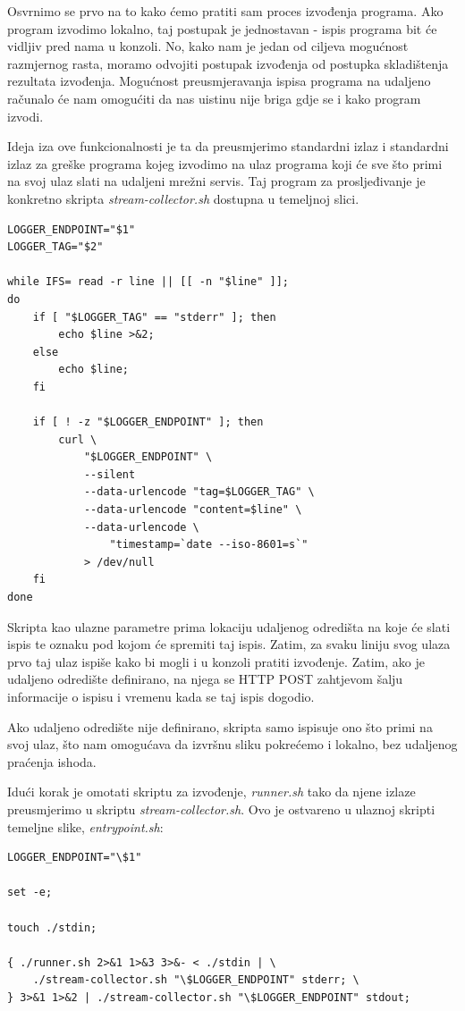 \documentclass[times, utf8, zavrsni]{fer}
\begin{document}
Osvrnimo se prvo na to kako ćemo pratiti sam proces izvođenja programa. Ako program izvodimo lokalno, taj postupak je jednostavan - ispis programa bit će vidljiv pred nama u konzoli. No, kako nam je jedan od ciljeva mogućnost razmjernog rasta, moramo odvojiti postupak izvođenja od postupka skladištenja rezultata izvođenja. Mogućnost preusmjeravanja ispisa programa na udaljeno računalo će nam omogućiti da nas uistinu nije briga gdje se i kako program izvodi.

Ideja iza ove funkcionalnosti je ta da preusmjerimo standardni izlaz i standardni izlaz za greške programa kojeg izvodimo na ulaz programa koji će sve što primi na svoj ulaz slati na udaljeni mrežni servis. Taj program za prosljeđivanje je konkretno skripta {\textit{stream-collector.sh}} dostupna u temeljnoj slici.

\begin{lstlisting}
LOGGER_ENDPOINT="$1"
LOGGER_TAG="$2"

while IFS= read -r line || [[ -n "$line" ]];
do
	if [ "$LOGGER_TAG" == "stderr" ]; then
		echo $line >&2;
	else
		echo $line;
	fi

	if [ ! -z "$LOGGER_ENDPOINT" ]; then
		curl \
			"$LOGGER_ENDPOINT" \
			--silent
			--data-urlencode "tag=$LOGGER_TAG" \
			--data-urlencode "content=$line" \
			--data-urlencode \
				"timestamp=`date --iso-8601=s`"
			> /dev/null
	fi
done
\end{lstlisting}

Skripta kao ulazne parametre prima lokaciju udaljenog odredišta na koje će slati ispis te oznaku pod kojom će spremiti taj ispis. Zatim, za svaku liniju svog ulaza prvo taj ulaz ispiše kako bi mogli i u konzoli pratiti izvođenje. Zatim, ako je udaljeno odredište definirano, na njega se HTTP POST zahtjevom šalju informacije o ispisu i vremenu kada se taj ispis dogodio.

Ako udaljeno odredište nije definirano, skripta samo ispisuje ono što primi na svoj ulaz, što nam omogućava da izvršnu sliku pokrećemo i lokalno, bez udaljenog praćenja ishoda.

Idući korak je omotati skriptu za izvođenje, {\textit{runner.sh}} tako da njene izlaze preusmjerimo u skriptu {\textit{stream-collector.sh}}. Ovo je ostvareno u ulaznoj skripti temeljne slike, {\textit{entrypoint.sh}}:

\begin{lstlisting}
LOGGER_ENDPOINT="\$1"

set -e;

touch ./stdin;

{ ./runner.sh 2>&1 1>&3 3>&- < ./stdin | \
	./stream-collector.sh "\$LOGGER_ENDPOINT" stderr; \
} 3>&1 1>&2 | ./stream-collector.sh "\$LOGGER_ENDPOINT" stdout;
\end{lstlisting}
\end{document}
